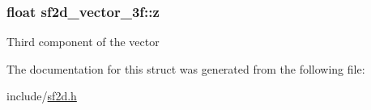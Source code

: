 \subsubsection[{z}]{\setlength{\rightskip}{0pt plus 5cm}float sf2d\+\_\+vector\+\_\+3f\+::z}\label{structsf2d__vector__3f_ab8ae4e1b464f00ac0d6dc3714f94ac18}
Third component of the vector 

The documentation for this struct was generated from the following file\+:\begin{DoxyCompactItemize}
\item 
include/\hyperlink{sf2d_8h}{sf2d.\+h}\end{DoxyCompactItemize}
